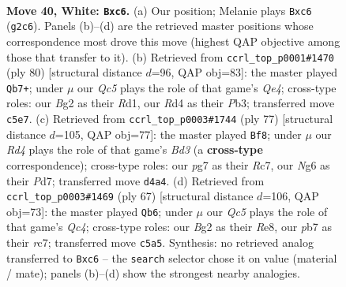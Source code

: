 \documentclass[11pt]{article}
\begin{document}
\clearpage

\begin{figure}[p]\centering
\begin{subfigure}{0.46\textwidth}\centering
\resizebox{\linewidth}{!}{%
\newchessgame
\chessboard[
  setfen={r7/1pk3p1/p1n2pN1/2Q3n1/3R3p/4P1P1/PPR2PBP/7K w - - 0 40},
  showmover=false,
  pgfstyle=straightmove, color=movearrow, markmove={g2-c6}
]}
\caption{}
\end{subfigure}\hfill
\begin{subfigure}{0.46\textwidth}\centering
\resizebox{\linewidth}{!}{%
\newchessgame
\chessboard[
  setfen={4r3/p5k1/3p1pp1/1Pp1n2p/P1B1Q3/1Pq4P/6P1/3R3K w - - 0 41},
  showmover=false,
  pgfstyle=straightmove, color=movearrow, markmove={e4-b7}
]}
\caption{}
\end{subfigure}
\\[4pt]
\begin{subfigure}{0.46\textwidth}\centering
\resizebox{\linewidth}{!}{%
\newchessgame
\chessboard[
  setfen={6k1/p1rp1p1p/1p1b2pn/4q3/2P1N3/P2B2P1/KP5P/3QR3 b - - 1 39},
  showmover=false,
  pgfstyle=straightmove, color=movearrow, markmove={d6-f8}
]}
\caption{}
\end{subfigure}\hfill
\begin{subfigure}{0.46\textwidth}\centering
\resizebox{\linewidth}{!}{%
\newchessgame
\chessboard[
  setfen={4r1k1/2R2p1p/2Nppbp1/1PqP4/8/2r4P/4QPP1/3R2K1 b - - 10 34},
  showmover=false,
  pgfstyle=straightmove, color=movearrow, markmove={c5-b6}
]}
\caption{}
\end{subfigure}
\caption{\textbf{Move 40, White: \texttt{Bxc6}.} (a) Our position; Melanie plays \texttt{Bxc6} (\texttt{g2c6}). Panels (b)--(d) are the retrieved master positions whose correspondence most drove this move (highest QAP objective among those that transfer to it). (b) Retrieved from \texttt{ccrl\_top\_p0001\#1470} (ply 80) [structural distance $d$=96, QAP obj=83]: the master played \texttt{Qb7+}; under $\mu$ our \emph{Qc5} plays the role of that game's \emph{Qe4}; cross-type roles: our \emph{B}g2 as their \emph{R}d1, our \emph{R}d4 as their \emph{P}b3; transferred move \texttt{c5e7}. (c) Retrieved from \texttt{ccrl\_top\_p0003\#1744} (ply 77) [structural distance $d$=105, QAP obj=77]: the master played \texttt{Bf8}; under $\mu$ our \emph{Rd4} plays the role of that game's \emph{Bd3} (a \textbf{cross-type} correspondence); cross-type roles: our \emph{p}g7 as their \emph{R}c7, our \emph{N}g6 as their \emph{P}d7; transferred move \texttt{d4a4}. (d) Retrieved from \texttt{ccrl\_top\_p0003\#1469} (ply 67) [structural distance $d$=106, QAP obj=73]: the master played \texttt{Qb6}; under $\mu$ our \emph{Qc5} plays the role of that game's \emph{Qc4}; cross-type roles: our \emph{B}g2 as their \emph{R}e8, our \emph{p}b7 as their \emph{r}c7; transferred move \texttt{c5a5}. Synthesis: no retrieved analog transferred to \texttt{Bxc6} -- the \texttt{search} selector chose it on value (material / mate); panels (b)--(d) show the strongest nearby analogies.}
\label{fig:thought-m78}
\end{figure}
\end{document}
